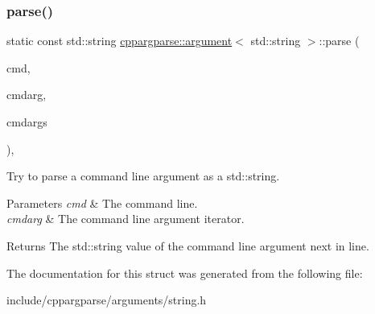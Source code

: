 \subsubsection{\texorpdfstring{parse()}{parse()}}
{\footnotesize\ttfamily static const std\+::string \hyperlink{structcppargparse_1_1argument}{cppargparse\+::argument}$<$ std\+::string $>$\+::parse (\begin{DoxyParamCaption}\item[{const types\+::\+Command\+Line\+\_\+t \&}]{cmd,  }\item[{const types\+::\+Command\+Line\+Argument\+\_\+t \&}]{cmdarg,  }\item[{const types\+::\+Command\+Line\+Arguments\+Map\+\_\+t \&}]{cmdargs }\end{DoxyParamCaption})\hspace{0.3cm}{\ttfamily [inline]}, {\ttfamily [static]}}



Try to parse a command line argument as a std\+::string. 


\begin{DoxyParams}{Parameters}
{\em cmd} & The command line. \\
\hline
{\em cmdarg} & The command line argument iterator.\\
\hline
\end{DoxyParams}
\begin{DoxyReturn}{Returns}
The std\+::string value of the command line argument next in line. 
\end{DoxyReturn}


The documentation for this struct was generated from the following file\+:\begin{DoxyCompactItemize}
\item 
include/cppargparse/arguments/string.\+h\end{DoxyCompactItemize}
